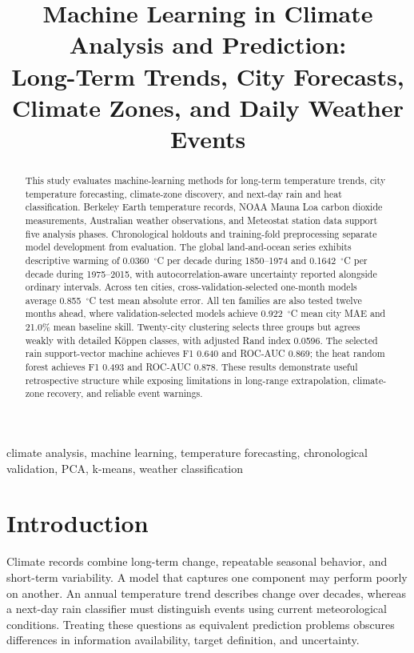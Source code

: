 \documentclass[conference]{IEEEtran}
\title{Machine Learning in Climate Analysis and Prediction:\\Long-Term Trends, City Forecasts, Climate Zones, and Daily Weather Events}
\author{\IEEEauthorblockN{Miguel A. De-Jesus-Rosa and Elias D Medina Galan}
\IEEEauthorblockA{Computer Engineering Department\\Universidad Ana G. M\'endez, Gurabo Campus\\Gurabo, Puerto Rico\\mde472@email.uagm.edu}}
\begin{document}
\maketitle
\begin{abstract}
This study evaluates machine-learning methods for long-term temperature trends, city temperature forecasting, climate-zone discovery, and next-day rain and heat classification. Berkeley Earth temperature records, NOAA Mauna Loa carbon dioxide measurements, Australian weather observations, and Meteostat station data support five analysis phases. Chronological holdouts and training-fold preprocessing separate model development from evaluation. The global land-and-ocean series exhibits descriptive warming of 0.0360~$^\circ$C per decade during 1850--1974 and 0.1642~$^\circ$C per decade during 1975--2015, with autocorrelation-aware uncertainty reported alongside ordinary intervals. Across ten cities, cross-validation-selected one-month models average 0.855~$^\circ$C test mean absolute error. All ten families are also tested twelve months ahead, where validation-selected models achieve 0.922~$^\circ$C mean city MAE and 21.0\% mean baseline skill. Twenty-city clustering selects three groups but agrees weakly with detailed K\"oppen classes, with adjusted Rand index 0.0596. The selected rain support-vector machine achieves F1 0.640 and ROC-AUC 0.869; the heat random forest achieves F1 0.493 and ROC-AUC 0.878. These results demonstrate useful retrospective structure while exposing limitations in long-range extrapolation, climate-zone recovery, and reliable event warnings.
\end{abstract}
\begin{IEEEkeywords}climate analysis, machine learning, temperature forecasting, chronological validation, PCA, k-means, weather classification\end{IEEEkeywords}

\section{Introduction}
Climate records combine long-term change, repeatable seasonal behavior, and short-term variability. A model that captures one component may perform poorly on another. An annual temperature trend describes change over decades, whereas a next-day rain classifier must distinguish events using current meteorological conditions. Treating these questions as equivalent prediction problems obscures differences in information availability, target definition, and uncertainty.
\end{document}
